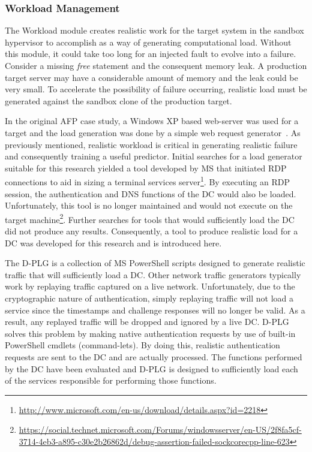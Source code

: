 \tabFaults
\tabTranslationThirtyTwo
\tabTranslationSixtyFour

\subsubsection{Workload Management} \label{sec:workloadMgr} 
The Workload module creates realistic work for the target system in the sandbox
hypervisor to accomplish as a way of generating computational load.  Without
this module, it could take too long for an injected fault to evolve into a
failure.  Consider a missing \emph{free} statement and the consequent memory
leak.  A production target server may have a considerable amount of memory and
the leak could be very small.  To accelerate the possibility of failure
occurring, realistic load must be generated against the sandbox clone of the
production target.

In the original \ac{AFP} case study, a Windows XP based web-server was used for
a target and the load generation was done by a simple web request
generator~\cite{irrera2015}.  As previously mentioned, realistic workload is
critical in generating realistic failure and consequently training a useful
predictor.  Initial searches for a load generator suitable for this research
yielded a tool developed by \ac{MS} that initiated \ac{RDP} connections
to aid in sizing a terminal services
server\footnote{\url{http://www.microsoft.com/en-us/download/details.aspx?id=2218}}.
By executing an \ac{RDP} session, the authentication and \ac{DNS}
functions of the \ac{DC} would also be loaded.  Unfortunately, this tool is no
longer maintained and would not execute on the target
machine\footnote{\url{https://social.technet.microsoft.com/Forums/windowsserver/en-US/2f8fa5cf-3714-4eb3-a895-c30e2b26862d/debug-assertion-failed-sockcorecpp-line-623}}.
Further searches for tools that would sufficiently load the \ac{DC} did not
produce any results.  Consequently, a tool to produce realistic load for a
\ac{DC} was developed for this research and is introduced here.

The \ac{D-PLG} is a collection of \ac{MS} PowerShell scripts designed to
generate realistic traffic that will sufficiently load a \ac{DC}.  Other
network traffic generators typically work by replaying traffic captured on a
live network.  Unfortunately, due to the cryptographic nature of
authentication, simply replaying traffic will not load a service since the
timestamps and challenge responses will no longer be valid.  As a result, any
replayed traffic will be dropped and ignored by a live \ac{DC}.  \ac{D-PLG}
solves this problem by making native authentication requests by use of built-in
PowerShell cmdlets (command-lets).  By doing this, realistic authentication
requests are sent to the \ac{DC} and are actually processed.  The functions
performed by the \ac{DC} have been evaluated and \ac{D-PLG} is designed to
sufficiently load each of the services responsible for performing those
functions.

